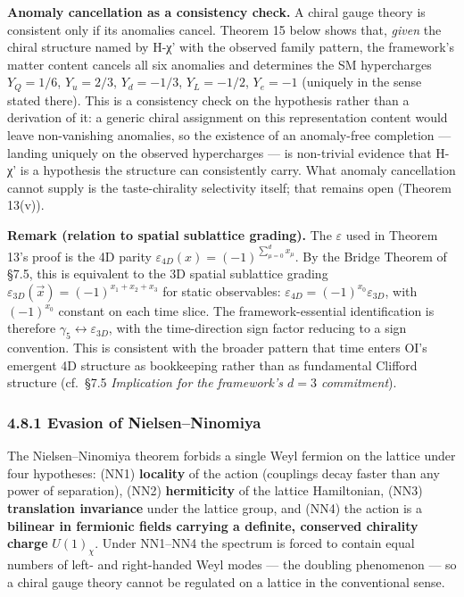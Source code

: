 \documentclass[
]{article}
\begin{document}
\textbf{Anomaly cancellation as a consistency check.} A chiral gauge
theory is consistent only if its anomalies cancel. Theorem 15 below
shows that, \emph{given} the chiral structure named by H-χ' with the
observed family pattern, the framework's matter content cancels all six
anomalies and determines the SM hypercharges \(Y_Q = 1/6\),
\(Y_u = 2/3\), \(Y_d = -1/3\), \(Y_L = -1/2\), \(Y_e = -1\) (uniquely in
the sense stated there). This is a consistency check on the hypothesis
rather than a derivation of it: a generic chiral assignment on this
representation content would leave non-vanishing anomalies, so the
existence of an anomaly-free completion --- landing uniquely on the
observed hypercharges --- is non-trivial evidence that H-χ' is a
hypothesis the structure can consistently carry. What anomaly
cancellation cannot supply is the taste-chirality selectivity itself;
that remains open (Theorem 13(v)).

\textbf{Remark (relation to spatial sublattice grading).} The
\(\varepsilon\) used in Theorem 13's proof is the 4D parity
\(\varepsilon_{4D}(x) = (-1)^{\sum_{\mu = 0}^{d}x_\mu}\). By the Bridge
Theorem of §7.5, this is equivalent to the 3D spatial sublattice grading
\(\varepsilon_{3D}(\vec x) = (-1)^{x_1 + x_2 + x_3}\) for static
observables: \(\varepsilon_{4D} = (-1)^{x_0} \varepsilon_{3D}\), with
\((-1)^{x_0}\) constant on each time slice. The framework-essential
identification is therefore
\(\gamma_5 \leftrightarrow \varepsilon_{3D}\), with the time-direction
sign factor reducing to a sign convention. This is consistent with the
broader pattern that time enters OI's emergent 4D structure as
bookkeeping rather than as fundamental Clifford structure (cf.~§7.5
\emph{Implication for the framework's \(d = 3\) commitment}).

\hypertarget{evasion-of-nielsenninomiya}{%
\subsubsection{4.8.1 Evasion of
Nielsen--Ninomiya}\label{evasion-of-nielsenninomiya}}

The Nielsen--Ninomiya theorem forbids a single Weyl fermion on the
lattice under four hypotheses: (NN1) \textbf{locality} of the action
(couplings decay faster than any power of separation), (NN2)
\textbf{hermiticity} of the lattice Hamiltonian, (NN3)
\textbf{translation invariance} under the lattice group, and (NN4) the
action is a \textbf{bilinear in fermionic fields carrying a definite,
conserved chirality charge} \(U(1)_\chi\). Under NN1--NN4 the spectrum
is forced to contain equal numbers of left- and right-handed Weyl modes
--- the doubling phenomenon --- so a chiral gauge theory cannot be
regulated on a lattice in the conventional sense.
\end{document}

